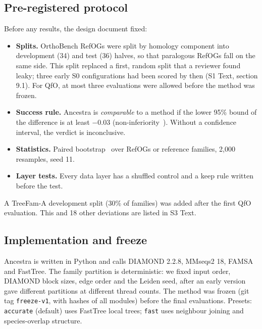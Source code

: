 \documentclass[10pt,letterpaper]{article}
\begin{document}
\subsection*{Pre-registered protocol}
Before any results, the design document fixed:
\begin{itemize}
\item \textbf{Splits.} OrthoBench RefOGs were split by homology component into development (34) and test (36) halves, so that paralogous RefOGs fall on the same side. This split replaced a first, random split that a reviewer found leaky; three early S0 configurations had been scored by then (S1 Text, section 9.1). For QfO, at most three evaluations were allowed before the method was frozen.
\item \textbf{Success rule.} Ancestra is \emph{comparable} to a method if the lower 95\% bound of the difference is at least $-0.03$ (non-inferiority~\cite{piaggio2012consortnoninferiority}). Without a confidence interval, the verdict is inconclusive.
\item \textbf{Statistics.} Paired bootstrap~\cite{efron1979bootstrap} over RefOGs or reference families, 2,000 resamples, seed 11.
\item \textbf{Layer tests.} Every data layer has a shuffled control and a keep rule written before the test.
\end{itemize}
A TreeFam-A development split (30\% of families) was added after the first QfO evaluation. This and 18 other deviations are listed in S3 Text.

\subsection*{Implementation and freeze}
Ancestra is written in Python and calls DIAMOND 2.2.8, MMseqs2 18, FAMSA and FastTree. The family partition is deterministic: we fixed input order, DIAMOND block sizes, edge order and the Leiden seed, after an early version gave different partitions at different thread counts. The method was frozen (git tag \texttt{freeze-v1}, with hashes of all modules) before the final evaluations. Presets: \texttt{accurate} (default) uses FastTree local trees; \texttt{fast} uses neighbour joining and species-overlap structure.
\end{document}
